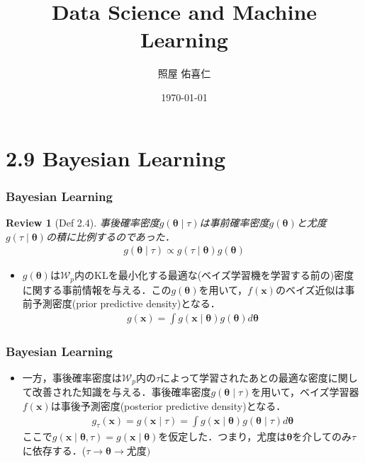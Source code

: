 \documentclass[dvipdfmx,cjk]{beamer}
\theoremstyle{example}
\newtheorem{rev}[thm]{Review}
\begin{document}
\title[]{Data Science and Machine Learning}
\author[]{照屋 佑喜仁}
\institute[]{}
\date{\today}

\begin{frame}
    \titlepage
\end{frame}

\begin{frame}
    \tableofcontents
\end{frame}

\section{2.9 Bayesian Learning}
\begin{frame}
    \frametitle{Bayesian Learning}
    \begin{rev}[Def 2.4]
        事後確率密度$g(\boldsymbol{\theta}\mid\tau)$は事前確率密度$g(\boldsymbol{\theta})$と尤度$g(\tau\mid\boldsymbol{\theta})$の積に比例するのであった．
        \begin{align*}
            g(\boldsymbol{\theta}\mid\tau)\propto g(\tau\mid\boldsymbol{\theta})g(\boldsymbol{\theta})
        \end{align*}
    \end{rev}
    \begin{itemize}
        \item $g(\boldsymbol{\theta})$は$\mathcal{W}_p$内のKLを最小化する最適な(ベイズ学習機を学習する前の)密度に関する事前情報を与える．この$g(\boldsymbol{\theta})$を用いて，$f(\boldsymbol{x})$のベイズ近似は事前予測密度(prior predictive density)となる．
              \begin{align*}
                  g(\boldsymbol{x})=\int g(\boldsymbol{x}\mid\boldsymbol{\theta})g(\boldsymbol{\theta}) d\boldsymbol{\theta}
              \end{align*}
    \end{itemize}
\end{frame}
\begin{frame}
    \frametitle{Bayesian Learning}
    \begin{itemize}
        \item 一方，事後確率密度は$\mathcal{W}_p$内の$\tau$によって学習されたあとの最適な密度に関して改善された知識を与える．事後確率密度$g(\boldsymbol{\theta}\mid\tau)$を用いて，ベイズ学習器$f(\boldsymbol{\boldsymbol{x}})$は事後予測密度(posterior predictive density)となる．
              \begin{align*}
                  g_\tau(\boldsymbol{x})=g(\boldsymbol{x}\mid\tau)=\int g(\boldsymbol{x}\mid\boldsymbol{\theta})g(\boldsymbol{\theta}\mid\tau) d\boldsymbol{\theta}
              \end{align*}
              ここで$g(\boldsymbol{x}\mid\boldsymbol{\theta},\tau)=g(\boldsymbol{x}\mid\boldsymbol{\theta})$を仮定した．つまり，尤度は$\boldsymbol{\theta}$を介してのみ$\tau$に依存する．($\tau\rightarrow\boldsymbol{\theta}\rightarrow\text{尤度})$
    \end{itemize}
\end{frame}
\end{document}
